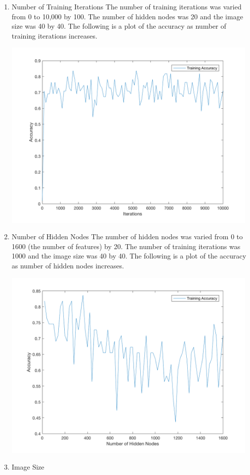 \documentclass[12pt]{article}
\begin{document}
\begin{enumerate}
  \item Number of Training Iterations
  The number of training iterations was varied from 0 to 10,000 by 100. The number of hidden nodes was 20 and the image size was 40 by 40. The following is a plot of the accuracy as number of training iterations increases.
  \begin{center}
    \includegraphics[width=125mm]{num_iterations_empirical.png}
    \label{fig:num_iterations}
  \end{center}
  \item Number of Hidden Nodes
  The number of hidden nodes was varied from 0 to 1600 (the number of features) by 20. The number of training iterations was 1000 and the image size was 40 by 40. The following is a plot of the accuracy as number of hidden nodes increases.
  \begin{center}
    \includegraphics[width=125mm]{hidden_node_empirical.png}
    \label{fig:num_hidden_nodes}
  \end{center}
  \item Image Size
\end{enumerate}
\end{document}
